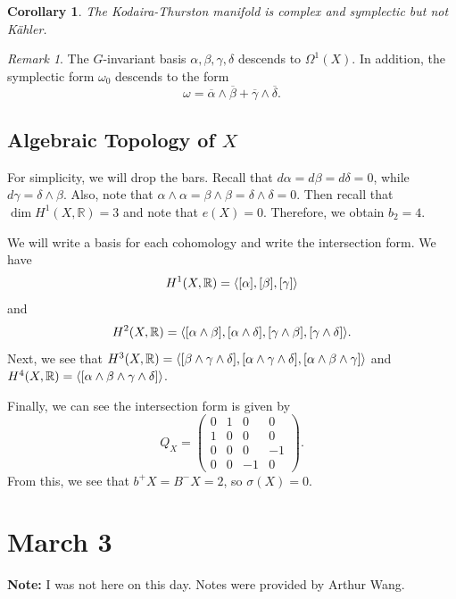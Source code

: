 \documentclass[leqno, openany]{memoir}
\DeclarePairedDelimiter{\gen}{\langle}{\rangle}
\newtheorem{cor}[thm]{Corollary}
\theoremstyle{definition}
\theoremstyle{remark}
\newtheorem{rmk}[thm]{Remark}
\theoremstyle{plain}
\theoremstyle{definition}
\theoremstyle{remark}
\newcommand{\R}{\mathbb{R}}
\begin{document}
\begin{cor}
    The Kodaira-Thurston manifold is complex and symplectic but not K\"ahler.
\end{cor}

\begin{rmk}
    The $G$-invariant basis $\alpha, \beta, \gamma, \delta$ descends to $\Omega^1(X)$. In addition, the symplectic form $\omega_0$ descends to the form
    \[ \omega = \overline{\alpha} \wedge \overline{\beta} + \overline{\gamma} \wedge \overline{\delta}. \]
\end{rmk}

\section{Algebraic Topology of $X$}%
\label{sec:algebraic_topology_of_x_}

For simplicity, we will drop the bars. Recall that $d \alpha = d \beta = d \delta = 0$, while $d \gamma = \delta \wedge \beta$. Also, note that $\alpha \wedge \alpha = \beta \wedge \beta = \delta \wedge \delta = 0$. Then recall that $\dim H^1(X, \R) = 3$ and note that $e(X) = 0$. Therefore, we obtain $b_2 = 4$.

We will write a basis for each cohomology and write the intersection form. We have
\[ H^1(X, \R) = \gen*{ [\alpha], [\beta], [\gamma] } \]
and
\[ H^2(X, \R) = \gen*{ [\alpha \wedge \beta], [\alpha \wedge \delta], [\gamma \wedge \beta], [\gamma \wedge \delta] }. \]
Next, we see that $H^3(X, \R) = \gen*{ [\beta \wedge \gamma \wedge \delta], [\alpha \wedge \gamma \wedge \delta], [\alpha \wedge \beta \wedge \gamma] }$ and $H^4(X, \R) = \gen*{[\alpha \wedge \beta \wedge \gamma \wedge \delta]}$.

Finally, we can see the intersection form is given by
\[ Q_X =  \begin{pmatrix}
    0 & 1 & 0 & 0 \\
    1 & 0 & 0 & 0 \\
    0 & 0 & 0 & -1 \\
    0 & 0 & -1 & 0
\end{pmatrix}. \]
From this, we see that $b^+X = B^-X = 2$, so $\sigma(X) = 0$.

\chapter{March 3}%
\label{cha:march_3}

\textbf{Note:} I was not here on this day. Notes were provided by Arthur Wang.
\end{document}
